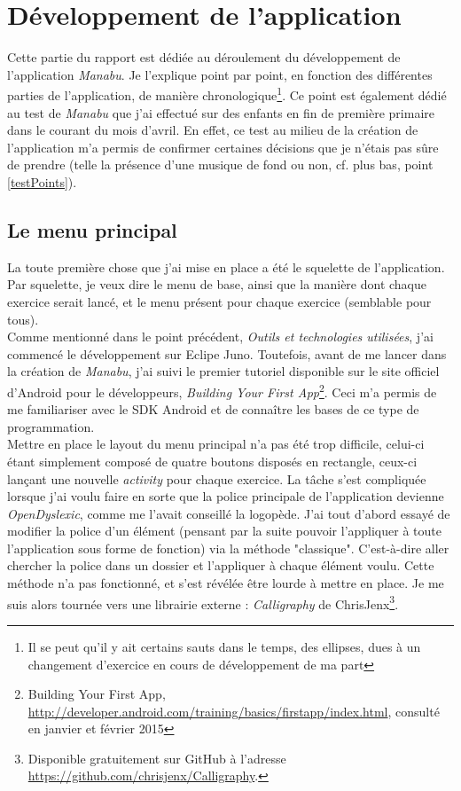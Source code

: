 \section{Développement de l'application}
Cette partie du rapport est dédiée au déroulement du développement de l'application \textit{Manabu}. Je l'explique point par point, en fonction des différentes parties de l'application, de manière chronologique\footnote{Il se peut qu'il y ait certains sauts dans le temps, des ellipses, dues à un changement d'exercice en cours de développement de ma part}. Ce point est également dédié au test de \textit{Manabu} que j'ai effectué sur des enfants en fin de première primaire dans le courant du mois d'avril. En effet, ce test au milieu de la création de l'application m'a permis de confirmer certaines décisions que je n'étais pas sûre de prendre (telle la présence d'une musique de fond ou non, cf. plus bas, point \ref{testPoints}). 

\subsection{Le menu principal}
La toute première chose que j'ai mise en place a été le squelette de l'application. Par squelette, je veux dire le menu de base, ainsi que la manière dont chaque exercice serait lancé, et le menu présent pour chaque exercice (semblable pour tous). \\

Comme mentionné dans le point précédent, \textit{Outils et technologies utilisées}, j'ai commencé le développement sur Eclipe Juno. Toutefois, avant de me lancer dans la création de \textit{Manabu}, j'ai suivi le premier tutoriel disponible sur le site officiel d'Android pour le développeurs, \textit{Building Your First App}\footnote{Building Your First App, \url{http://developer.android.com/training/basics/firstapp/index.html}, consulté en janvier et février 2015}. Ceci m'a permis de me familiariser avec le SDK Android et de connaître les bases de ce type de programmation.\\

Mettre en place le layout du menu principal n'a pas été trop difficile, celui-ci étant simplement composé de quatre boutons disposés en rectangle, ceux-ci lançant une nouvelle \textit{activity} pour chaque exercice. La tâche s'est compliquée lorsque j'ai voulu faire en sorte que la police principale de l'application devienne \textit{OpenDyslexic}, comme me l'avait conseillé la logopède. J'ai tout d'abord essayé de modifier la police d'un élément (pensant par la suite pouvoir l'appliquer à toute l'application sous forme de fonction) via la méthode "classique". C'est-à-dire aller chercher la police dans un dossier et l'appliquer à chaque élément voulu. Cette méthode n'a pas fonctionné, et s'est révélée être lourde à mettre en place. Je me suis alors tournée vers une librairie externe : \textit{Calligraphy} de ChrisJenx\footnote{Disponible gratuitement sur GitHub à l'adresse \url{https://github.com/chrisjenx/Calligraphy}.}.\\

